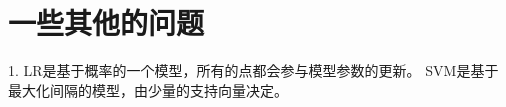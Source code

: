 \section{一些其他的问题}
	1. LR是基于概率的一个模型，所有的点都会参与模型参数的更新。
	   SVM是基于最大化间隔的模型，由少量的支持向量决定。
	
	













